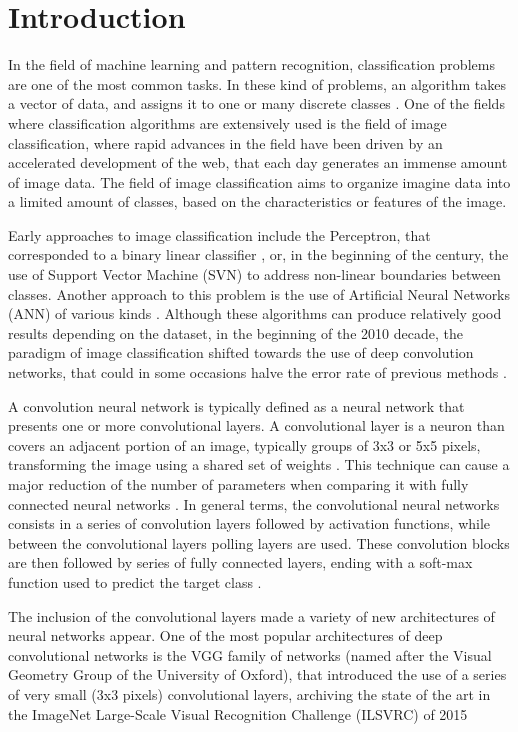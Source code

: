 \documentclass[10pt,twocolumn,letterpaper]{article}
\begin{document}
\section{Introduction}

In the field of machine learning  and pattern recognition, classification problems are one of the most common tasks. In these kind of problems, an algorithm takes a vector of data, and assigns it to one or many discrete classes \cite{Bishop2006}. One of the fields where classification algorithms are extensively used is the field of image classification, where rapid advances in the field have been driven by an accelerated development of the web, that each day generates an immense amount of image data. The field of image classification aims to organize imagine data into a limited amount of classes, based on the characteristics or features of the image. \cite{Zhang2019}

Early approaches to image classification include the Perceptron, that corresponded to a binary linear classifier \cite{Rosenblatt1957}, or, in the beginning of the century, the use of Support Vector Machine (SVN) \cite{Vapnik1995} to address non-linear boundaries between classes. Another approach to this problem is the use of Artificial Neural Networks (ANN) of various kinds \cite{Krizhevsky2017}. Although these algorithms can produce relatively good results depending on the dataset, in the beginning of the 2010 decade, the paradigm of image classification shifted towards the use of deep convolution networks, that could in some occasions halve the error rate of previous methods \cite{Krizhevsky2017}. 

A convolution neural network is typically defined as a neural network that presents one or more convolutional layers. A convolutional layer is a neuron than covers an adjacent portion of an image, typically groups of 3x3 or 5x5 pixels, transforming the image using a shared set of weights . This technique can cause a major reduction of the number of parameters when comparing it with fully connected neural networks \cite{Aghdam2017}. In general terms, the convolutional neural networks consists in a series of convolution layers followed by activation functions, while between the convolutional layers polling layers are used. These convolution blocks are then followed by series of fully connected layers, ending with a soft-max function used to predict the target class \cite{Krizhevsky2017}.

The inclusion of the convolutional layers made a variety of new architectures of neural networks appear. One of the most popular architectures of deep convolutional networks is the VGG family of networks (named after the Visual Geometry Group of the University of Oxford), that introduced the use of a series of very small (3x3 pixels) convolutional layers, archiving the state of the art in the ImageNet Large-Scale Visual Recognition Challenge (ILSVRC) of 2015 \cite{Simonyan2015}
\end{document}
